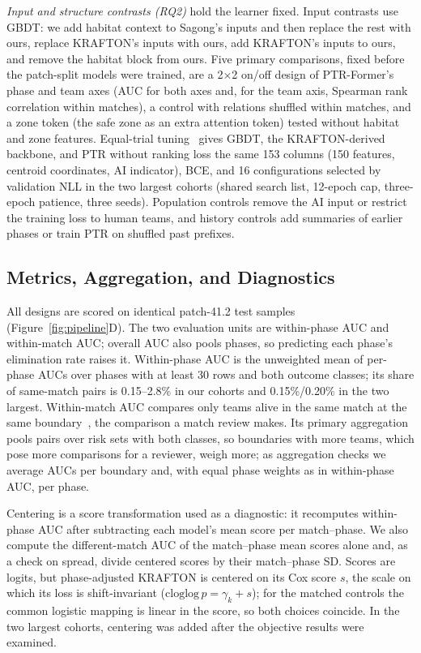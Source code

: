 \documentclass[sigconf,anonymous,nonacm]{acmart}
\begin{document}
\emph{Input and structure contrasts (RQ2)} hold the learner fixed. Input contrasts use GBDT: we add habitat context to Sagong's inputs and then replace the rest with ours, replace KRAFTON's inputs with ours, add KRAFTON's inputs to ours, and remove the habitat block from ours. Five primary comparisons, fixed before the patch-split models were trained, are a 2$\times$2 on/off design of PTR-Former's phase and team axes (AUC for both axes and, for the team axis, Spearman rank correlation within matches), a control with relations shuffled within matches, and a zone token (the safe zone as an extra attention token) tested without habitat and zone features. Equal-trial tuning~\cite{Bergstra12,Cawley10} gives GBDT, the KRAFTON-derived backbone, and PTR without ranking loss the same 153 columns (150 features, centroid coordinates, AI indicator), BCE, and 16 configurations selected by validation NLL in the two largest cohorts (shared search list, 12-epoch cap, three-epoch patience, three seeds). Population controls remove the AI input or restrict the training loss to human teams, and history controls add summaries of earlier phases or train PTR on shuffled past prefixes.

\subsection{Metrics, Aggregation, and Diagnostics}
\label{sec:method:units}
All designs are scored on identical patch-41.2 test samples (Figure~\ref{fig:pipeline}D). The two evaluation units are within-phase AUC and within-match AUC; overall AUC also pools phases, so predicting each phase's elimination rate raises it. Within-phase AUC is the unweighted mean of per-phase AUCs over phases with at least 30 rows and both outcome classes; its share of same-match pairs is 0.15--2.8\% in our cohorts and 0.15\%/0.20\% in the two largest. Within-match AUC compares only teams alive in the same match at the same boundary~\cite{HeagertyZheng05,vanKlaveren14}, the comparison a match review makes. Its primary aggregation pools pairs over risk sets with both classes, so boundaries with more teams, which pose more comparisons for a reviewer, weigh more; as aggregation checks we average AUCs per boundary and, with equal phase weights as in within-phase AUC, per phase.

Centering is a score transformation used as a diagnostic: it recomputes within-phase AUC after subtracting each model's mean score per match--phase. We also compute the different-match AUC of the match--phase mean scores alone and, as a check on spread, divide centered scores by their match--phase SD. Scores are logits, but phase-adjusted KRAFTON is centered on its Cox score $s$, the scale on which its loss is shift-invariant ($\mathrm{cloglog}\,p=\gamma_k+s$); for the matched controls the common logistic mapping is linear in the score, so both choices coincide. In the two largest cohorts, centering was added after the objective results were examined.
\end{document}
